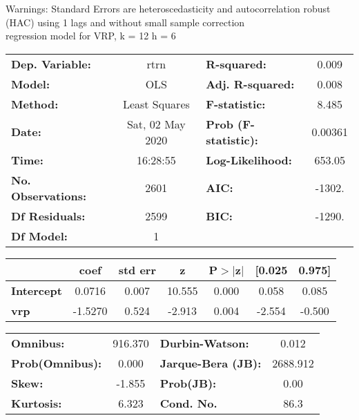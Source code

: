 Warnings: \newline
 [1] Standard Errors are heteroscedasticity and autocorrelation robust (HAC) using 1 lags and without small sample correction\\ 

regression model for VRP, k = 12 h = 6\begin{center}
\begin{tabular}{lclc}
\toprule
\textbf{Dep. Variable:}    &       rtrn       & \textbf{  R-squared:         } &     0.009   \\
\textbf{Model:}            &       OLS        & \textbf{  Adj. R-squared:    } &     0.008   \\
\textbf{Method:}           &  Least Squares   & \textbf{  F-statistic:       } &     8.485   \\
\textbf{Date:}             & Sat, 02 May 2020 & \textbf{  Prob (F-statistic):} &  0.00361    \\
\textbf{Time:}             &     16:28:55     & \textbf{  Log-Likelihood:    } &    653.05   \\
\textbf{No. Observations:} &        2601      & \textbf{  AIC:               } &    -1302.   \\
\textbf{Df Residuals:}     &        2599      & \textbf{  BIC:               } &    -1290.   \\
\textbf{Df Model:}         &           1      & \textbf{                     } &             \\
\bottomrule
\end{tabular}
\begin{tabular}{lcccccc}
                   & \textbf{coef} & \textbf{std err} & \textbf{z} & \textbf{P$> |$z$|$} & \textbf{[0.025} & \textbf{0.975]}  \\
\midrule
\textbf{Intercept} &       0.0716  &        0.007     &    10.555  &         0.000        &        0.058    &        0.085     \\
\textbf{vrp}       &      -1.5270  &        0.524     &    -2.913  &         0.004        &       -2.554    &       -0.500     \\
\bottomrule
\end{tabular}
\begin{tabular}{lclc}
\textbf{Omnibus:}       & 916.370 & \textbf{  Durbin-Watson:     } &    0.012  \\
\textbf{Prob(Omnibus):} &   0.000 & \textbf{  Jarque-Bera (JB):  } & 2688.912  \\
\textbf{Skew:}          &  -1.855 & \textbf{  Prob(JB):          } &     0.00  \\
\textbf{Kurtosis:}      &   6.323 & \textbf{  Cond. No.          } &     86.3  \\
\bottomrule
\end{tabular}
\end{center}


